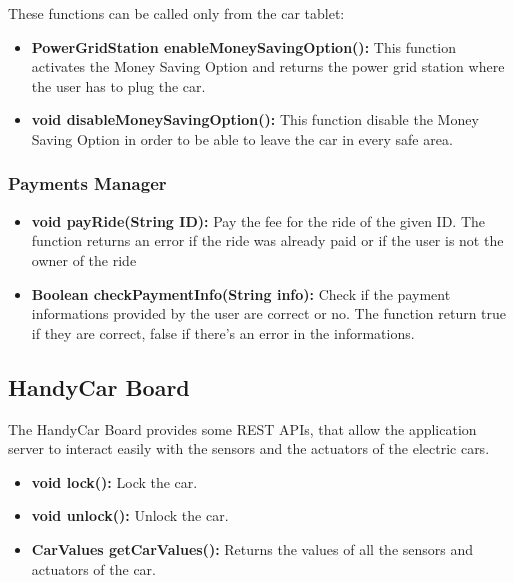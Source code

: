 These functions can be called only from the car tablet:
\begin{itemize}
	\item \textbf{PowerGridStation enableMoneySavingOption():} This function activates the Money Saving Option and returns the power grid station where the user has to plug the car.
	\item \textbf{void disableMoneySavingOption():} This function disable the Money Saving Option in order to be able to leave the car in every safe area.
\end{itemize}

\subsubsection{Payments Manager}
\begin{itemize}
	\item \textbf{void payRide(String ID):} Pay the fee for the ride of the given ID. The function returns an error if the ride was already paid or if the user is not the owner of the ride
	\item \textbf{Boolean checkPaymentInfo(String info):} Check if the payment informations provided by the user are correct or no. The function return true if they are correct, false if there's an error in the informations.
\end{itemize}

\subsection{HandyCar Board}
The HandyCar Board provides some REST APIs, that allow the application server to interact easily with the sensors and the actuators of the electric cars.

\begin{itemize}
	\item \textbf{void lock():} Lock the car.
	\item \textbf{void unlock():} Unlock the car.
	\item \textbf{CarValues getCarValues():} Returns the values of all the sensors and actuators of the car.
\end{itemize}